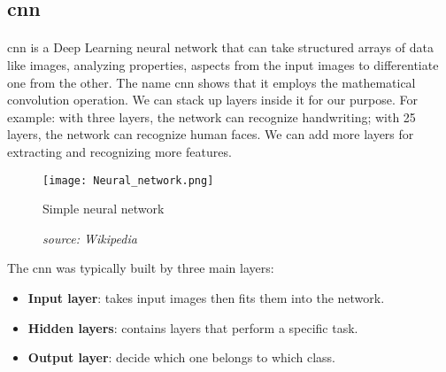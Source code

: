 \subsection{\acrlong{cnn}}
\paragraph{}

\acrfull{cnn} is a Deep Learning neural network that can take structured arrays of data like images, analyzing properties, aspects from the input images to differentiate one from the other. The name \acrlong{cnn} shows that it employs the mathematical convolution operation. We can stack up layers inside it for our purpose. For example: with three layers, the network can recognize handwriting; with 25 layers, the network can recognize human faces. We can add more layers for extracting and recognizing more features.

\begin{figure}[H]
    \centering
    \texttt{[image: Neural\_network.png]}
    \caption{Simple neural network}
    \caption*{\textit{source: Wikipedia}}
    \label{fig:simpleCNN}
\end{figure}

The \acrshort{cnn} was typically built by three main layers:

\begin{itemize}
    \item \textbf{Input layer}: takes input images then fits them into the network.
    \item \textbf{Hidden layers}: contains layers that perform a specific task.
    \item \textbf{Output layer}: decide which one belongs to which class.
\end{itemize}

